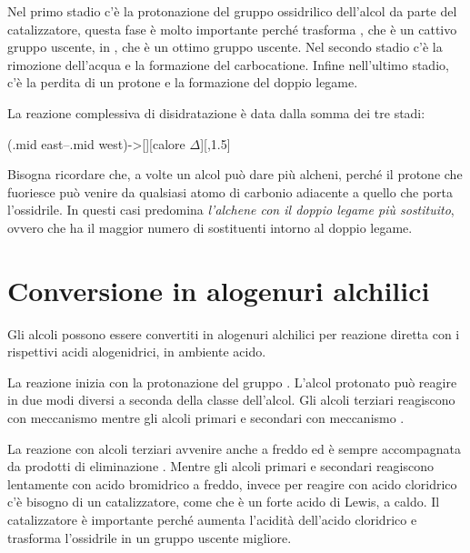 Nel primo stadio c'è la protonazione del gruppo ossidrilico dell'alcol da parte del catalizzatore, questa fase è molto importante perché trasforma , che è un cattivo gruppo uscente, in , che è un ottimo gruppo uscente. Nel secondo stadio c'è la rimozione dell'acqua e la formazione del carbocatione. Infine nell'ultimo stadio, c'è la perdita di un protone e la formazione del doppio legame.

La reazione complessiva di disidratazione è data dalla somma dei tre stadi:
\begin{reaction}
	\arrow(.mid east--.mid west){->[][calore \(\Delta\)]}[,1.5]
	 \+ 
\end{reaction}

Bisogna ricordare che, a volte un alcol può dare più alcheni, perché il protone che fuoriesce può venire da qualsiasi atomo di carbonio adiacente a quello che porta l'ossidrile. In questi casi predomina \textit{l'alchene con il doppio legame più sostituito}, ovvero che ha il maggior numero di sostituenti intorno al doppio legame.


\section{Conversione in alogenuri alchilici}\label{rxn:alcol-convHX}
Gli alcoli possono essere convertiti in alogenuri alchilici per reazione diretta con i rispettivi acidi alogenidrici, in ambiente acido.

La reazione inizia con la protonazione del gruppo . L'alcol protonato può reagire in due modi diversi a seconda della classe dell'alcol. Gli alcoli terziari reagiscono con meccanismo \mech[1] mentre gli alcoli primari e secondari con meccanismo \mech[2].

La reazione con alcoli terziari avvenire anche a freddo ed è sempre accompagnata da prodotti di eliminazione \mech[e1]. Mentre gli alcoli primari e secondari reagiscono lentamente con acido bromidrico  a freddo, invece per reagire con acido cloridrico  c'è bisogno di un catalizzatore, come  che è un forte acido di Lewis, a caldo. Il catalizzatore è importante perché aumenta l'acidità dell'acido cloridrico e trasforma l'ossidrile in un gruppo uscente migliore.

